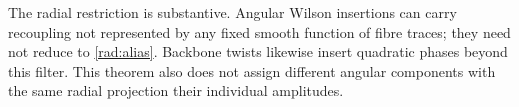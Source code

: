 The radial restriction is substantive. Angular Wilson
insertions can carry recoupling not represented by any
fixed smooth function of fibre traces; they need not reduce
to \eqref{rad:alias}. Backbone twists likewise insert
quadratic phases beyond this filter. This theorem also does
not assign different angular components with the same radial
projection their individual amplitudes.
